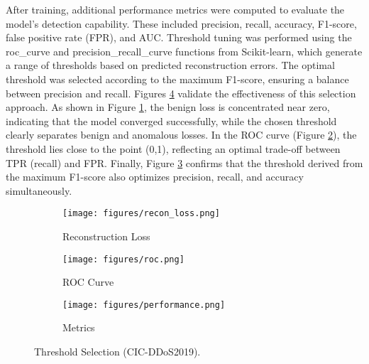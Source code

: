 After training, additional performance metrics were computed to evaluate the model’s detection capability. These included precision, recall, accuracy, F1-score, false positive rate (FPR), and AUC. Threshold tuning was performed using the roc\_curve \citep{sklearnrc} and precision\_recall\_curve \citep{sklearnprc} functions from Scikit-learn, which generate a range of thresholds based on predicted reconstruction errors. The optimal threshold was selected according to the maximum F1-score, ensuring a balance between precision and recall. Figures \ref{fig:threshold_selection} validate the effectiveness of this selection approach. As shown in Figure \ref{fig:threshold_selection_recon}, the benign loss is concentrated near zero, indicating that the model converged successfully, while the chosen threshold clearly separates benign and anomalous losses. In the ROC curve (Figure \ref{fig:threshold_selection_roc}), the threshold lies close to the point (0,1), reflecting an optimal trade-off between TPR (recall) and FPR. Finally, Figure \ref{fig:threshold_selection_metrics} confirms that the threshold derived from the maximum F1-score also optimizes precision, recall, and accuracy simultaneously.

\begin{figure}[h]
    \centering

    \begin{subfigure}[b]{0.32\textwidth}
        \centering
        \texttt{[image: figures/recon\_loss.png]}
        \caption{Reconstruction Loss}
        \label{fig:threshold_selection_recon}
    \end{subfigure}
    \hfill
    \begin{subfigure}[b]{0.32\textwidth}
        \centering
        \texttt{[image: figures/roc.png]}
        \caption{ROC Curve}
        \label{fig:threshold_selection_roc}
    \end{subfigure}
    \hfill
    \begin{subfigure}[b]{0.32\textwidth}
        \centering
        \texttt{[image: figures/performance.png]}
        \caption{Metrics}
        \label{fig:threshold_selection_metrics}
    \end{subfigure}

    \caption{Threshold Selection (CIC-DDoS2019).}
    \label{fig:threshold_selection}
\end{figure}

